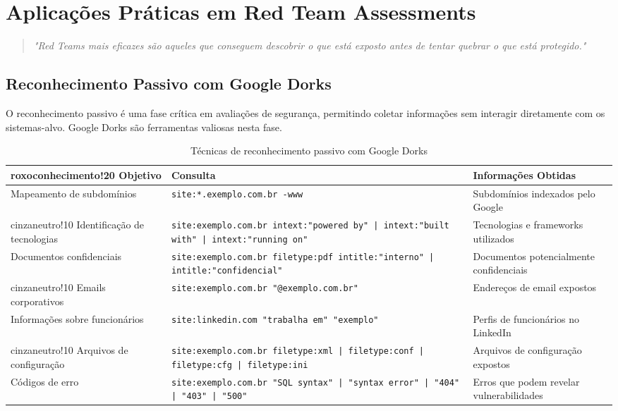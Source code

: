 \documentclass[12pt,a4paper]{book}
\begin{document}
\chapter{Aplicações Práticas em Red Team Assessments}

\begin{quote}
\textit{"Red Teams mais eficazes são aqueles que conseguem descobrir o que está exposto antes de tentar quebrar o que está protegido."} \\
\end{quote}

\section{Reconhecimento Passivo com Google Dorks}

O reconhecimento passivo é uma fase crítica em avaliações de segurança, permitindo coletar informações sem interagir diretamente com os sistemas-alvo. Google Dorks são ferramentas valiosas nesta fase.

\begin{table}[h]
\centering
\begin{tabular}{|p{3.5cm}|p{4.5cm}|p{7cm}|}
\hline
{roxoconhecimento!20} \textbf{Objetivo} & \textbf{Consulta} & \textbf{Informações Obtidas} \\
\hline
Mapeamento de subdomínios & \texttt{site:*.exemplo.com.br -www} & Subdomínios indexados pelo Google \\
\hline
{cinzaneutro!10} Identificação de tecnologias & \texttt{site:exemplo.com.br intext:"powered by" | intext:"built with" | intext:"running on"} & Tecnologias e frameworks utilizados \\
\hline
Documentos confidenciais & \texttt{site:exemplo.com.br filetype:pdf intitle:"interno" | intitle:"confidencial"} & Documentos potencialmente confidenciais \\
\hline
{cinzaneutro!10} Emails corporativos & \texttt{site:exemplo.com.br "@exemplo.com.br"} & Endereços de email expostos \\
\hline
Informações sobre funcionários & \texttt{site:linkedin.com "trabalha em" "exemplo"} & Perfis de funcionários no LinkedIn \\
\hline
{cinzaneutro!10} Arquivos de configuração & \texttt{site:exemplo.com.br filetype:xml | filetype:conf | filetype:cfg | filetype:ini} & Arquivos de configuração expostos \\
\hline
Códigos de erro & \texttt{site:exemplo.com.br "SQL syntax" | "syntax error" | "404" | "403" | "500"} & Erros que podem revelar vulnerabilidades \\
\hline
\end{tabular}
\caption{Técnicas de reconhecimento passivo com Google Dorks}
\end{table}
\end{document}
